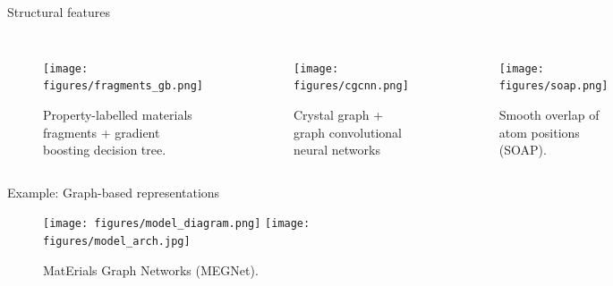 \documentclass[aspectratio=169]{beamer}
\begin{document}
    \begin{frame}{Structural features}
        \begin{columns}
            \begin{figure}
                \centering
                \texttt{[image: figures/fragments\_gb.png]}
                \caption{Property-labelled materials fragments + gradient boosting decision tree.\cite{isayevUniversalFragmentDescriptors2016}}
            \end{figure}
            \begin{figure}
                \centering
                \texttt{[image: figures/cgcnn.png]}
                \caption{Crystal graph + graph convolutional neural networks}
            \end{figure}
            \begin{figure}
                \centering
                \texttt{[image: figures/soap.png]}
                \caption{Smooth overlap of atom positions (SOAP).\cite{rosenbrockDiscoveringBuildingBlocks2017}}
            \end{figure}
        \end{columns}
    \end{frame}


    \begin{frame}{Example: Graph-based representations}
        \begin{figure}
            \centering
            \texttt{[image: figures/model\_diagram.png]}
            \texttt{[image: figures/model\_arch.jpg]}
            \caption{MatErials Graph Networks (MEGNet).\cite{chenGraphNetworksUniversal2019}}
        \end{figure}
    \end{frame}
\end{document}
